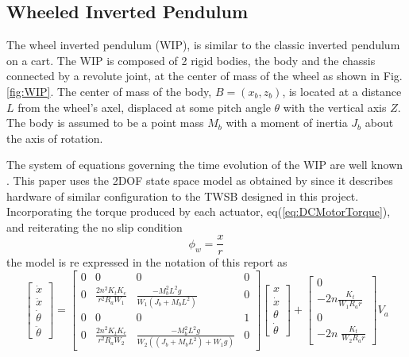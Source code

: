     \subsection{Wheeled Inverted Pendulum}
    The wheel inverted pendulum (WIP), is similar to the classic inverted pendulum on a cart. 
    The WIP is composed of 2 rigid bodies, the body and the chassis connected by a revolute joint, 
    at the center of mass of the wheel as shown in Fig.\ref{fig:WIP}. 
    The center of mass of the body, $B=(x_b,z_b)$, 
    is located at a distance $L$ from the wheel's axel, displaced at some pitch angle $\theta$ with 
    the vertical axis $Z$. The body is assumed to be a point mass $M_b$ with a moment of inertia $J_b$ 
    about the axis of rotation. 
    
    The system of equations governing the time evolution of the WIP are well known
    \cite{frankovsky2017modeling} \cite{ModelingWIPLagrange}.
    This paper uses the 2DOF state space model as obtained by \cite{Velazquez2016VelocityAM} since it describes 
    hardware of similar configuration to the TWSB designed in this project. 
    Incorporating the torque produced by each actuator, eq(\ref{eq:DCMotorTorque}),
    and reiterating the no slip condition 
    \begin{equation}
        \phi_w = \frac{x}{r}
    \end{equation}
    the model is re expressed in the notation of this report as 
    \begin{equation}
        \begin{bmatrix}
        \dot{x} \\
        \ddot{x} \\
        \dot{\theta} \\
        \ddot{\theta} 
        \end{bmatrix} =
        \begin{bmatrix}
        0 & 0 & 0 & 0\\
        0 & \frac{2n^2 K_t K_e }{r^2 R_a W_1 } & \frac{-M_b^2 L^2 g}{W_1 \left(J_b +M_b L^2 \right)} & 0\\
        0 & 0 & 0 & 1\\
        0 & \frac{2n^2 K_t K_e }{r^2 R_a W_2 } & \frac{-M_b^2 L^2 g}{W_2 \left(\left(J_b +M_b L^2 \right)+W_1 g\right)} & 0
        \end{bmatrix}
        \begin{bmatrix}
        x\\
        \dot{x} \\
        \theta \\
        \dot{\theta} 
        \end{bmatrix} +
        \begin{bmatrix}
        0\\
        -2n\frac{K_t }{W_1 R_a r}\\
        0\\
        -2n\;\frac{K_t }{W_2 R_a r}
        \end{bmatrix}
        V_a
    \label{eq:2DOF}
    \end{equation}

